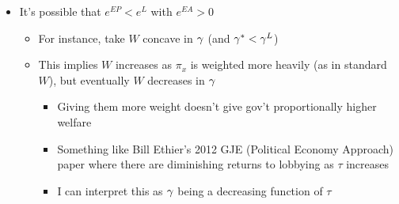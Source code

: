 \begin{itemize}
		
	 \item It's possible that $e^{EP} < e^{L}$ with $e^{EA} > 0$
		\begin{itemize}
			\item For instance, take $W$ concave in $\gamma$ (and $\gamma^* < \gamma^L$)
			\item This implies $W$ increases as $\pi_x$ is weighted more heavily (as in standard $W$), but eventually $W$ decreases in $\gamma$
				\begin{itemize}
					\item Giving them more weight doesn't give gov't proportionally higher welfare
					\item Something like Bill Ethier's 2012 GJE (Political Economy Approach) paper where there are diminishing returns to lobbying as $\tau$ increases
					\item I can interpret this as $\gamma$ being a decreasing function of $\tau$
				\end{itemize}
		\end{itemize}
\end{itemize}



